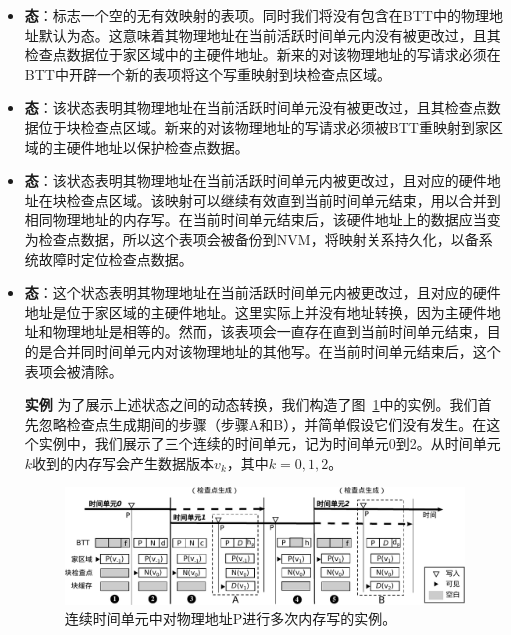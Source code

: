\begin{itemize}
\item \textbf{态}：标志一个空的无有效映射的表项。同时我们将没有包含在BTT中的物理地址默认为态。这意味着其物理地址在当前活跃时间单元内没有被更改过，且其检查点数据位于家区域中的主硬件地址。新来的对该物理地址的写请求必须在BTT中开辟一个新的表项将这个写重映射到块检查点区域。

\item \textbf{态}：该状态表明其物理地址在当前活跃时间单元没有被更改过，且其检查点数据位于块检查点区域。新来的对该物理地址的写请求必须被BTT重映射到家区域的主硬件地址以保护检查点数据。

\item \textbf{态}：该状态表明其物理地址在当前活跃时间单元内被更改过，且对应的硬件地址在块检查点区域。该映射可以继续有效直到当前时间单元结束，用以合并到相同物理地址的内存写。在当前时间单元结束后，该硬件地址上的数据应当变为检查点数据，所以这个表项会被备份到NVM，将映射关系持久化，以备系统故障时定位检查点数据。

\item \textbf{态}：这个状态表明其物理地址在当前活跃时间单元内被更改过，且对应的硬件地址是位于家区域的主硬件地址。这里实际上并没有地址转换，因为主硬件地址和物理地址是相等的。然而，该表项会一直存在直到当前时间单元结束，目的是合并同时间单元内对该物理地址的其他写。在当前时间单元结束后，这个表项会被清除。


\vspace{\noindentsep}
\noindent \textbf{实例  }为了展示上述状态之间的动态转换，我们构造了图~\ref{fig-example}中的实例。我们首先忽略检查点生成期间的步骤（步骤A和B），并简单假设它们没有发生。在这个实例中，我们展示了三个连续的时间单元，记为时间单元0到2。从时间单元$k$收到的内存写会产生数据版本$v_k$，其中$k = 0, 1, 2$。

\begin{figure}[!ht]
\centering
\includegraphics[width=\linewidth]{figures/example.pdf}
\caption{连续时间单元中对物理地址P进行多次内存写的实例。}
\label{fig-example}
\end{figure}


\end{itemize}
